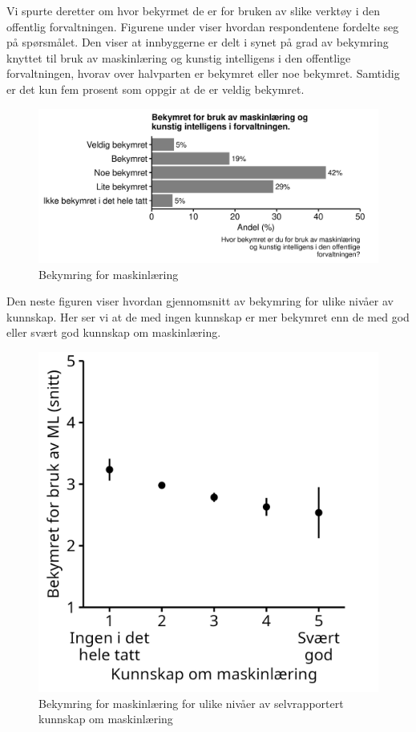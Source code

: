 \documentclass[
  12pt,
  a4paper, 12pt]{article}
\begin{document}
Vi spurte deretter om hvor bekyrmet de er for bruken av slike verktøy i den offentlig forvaltningen. Figurene under viser hvordan respondentene fordelte seg på spørsmålet. Den viser at innbyggerne er delt i synet på grad av bekymring knyttet til bruk av maskinlæring og kunstig intelligens i den offentlige forvaltningen, hvorav over halvparten er bekymret eller noe bekymret.
Samtidig er det kun fem prosent som oppgir at de er veldig bekymret.

\begin{figure}

{\centering \includegraphics[width=0.8\linewidth]{figs/png/fig_ml_worried} 

}

\caption{Bekymring for maskinlæring}\label{fig:unnamed-chunk-16}
\end{figure}

Den neste figuren viser hvordan gjennomsnitt av bekymring for ulike nivåer av kunnskap. Her ser vi at de med ingen kunnskap er mer bekymret enn de med god eller svært god kunnskap om maskinlæring.

\begin{figure}

{\centering \includegraphics[width=0.5\linewidth]{figs/png/fig_ml_worried_by_knowledge} 

}

\caption{Bekymring for maskinlæring for ulike nivåer av selvrapportert kunnskap om maskinlæring}\label{fig:unnamed-chunk-17}
\end{figure}
\end{document}
